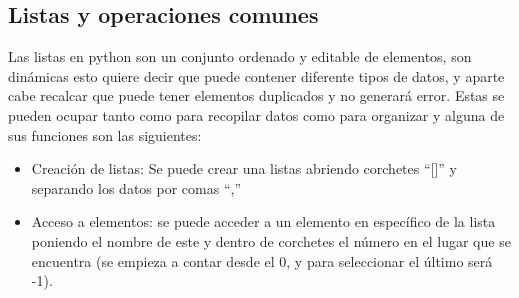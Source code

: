 \subsection{Listas y operaciones comunes}
Las listas en python son un conjunto ordenado y editable de elementos, son dinámicas esto quiere decir que puede contener diferente tipos de datos, y aparte cabe recalcar que puede tener elementos duplicados y no generará error. Estas se pueden ocupar tanto como para recopilar datos como para organizar y alguna de sus funciones son las siguientes:

\begin{itemize}
    \item Creación de listas: Se puede crear una listas abriendo corchetes ``[]'' y separando los datos por comas ``,''
    \begin{figure}[h]
        \centering
      \end{figure}
    \newpage
    \item Acceso a elementos: se puede acceder a un elemento en específico de la lista poniendo el nombre de este y dentro de corchetes el número en el lugar que se encuentra  (se empieza a contar desde el 0, y para seleccionar el último será -1).
    \begin{figure}[h]
        \centering
      \end{figure}
    

\end{itemize}
